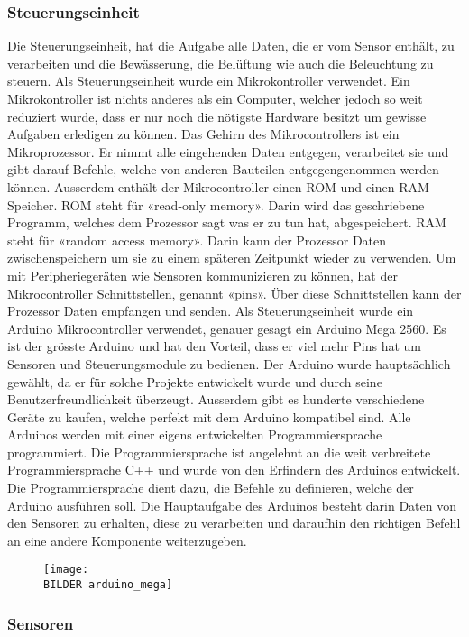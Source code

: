 \subsubsection{Steuerungseinheit}
Die Steuerungseinheit, hat die Aufgabe alle Daten, die er vom Sensor enthält, zu verarbeiten und die Bewässerung, die Belüftung wie auch die Beleuchtung zu steuern.
Als Steuerungseinheit wurde ein Mikrokontroller verwendet. Ein Mikrokontroller ist nichts anderes als ein Computer, welcher jedoch so weit reduziert wurde, dass er nur noch die nötigste Hardware besitzt um gewisse Aufgaben erledigen zu können. Das Gehirn des Mikrocontrollers ist ein Mikroprozessor. Er nimmt alle eingehenden Daten entgegen, verarbeitet sie und gibt darauf Befehle, welche von anderen Bauteilen entgegengenommen werden können. Ausserdem enthält der Mikrocontroller einen ROM und einen RAM Speicher. ROM steht für «read-only memory». Darin wird das geschriebene Programm, welches dem Prozessor sagt was er zu tun hat, abgespeichert. RAM steht für «random access memory». Darin kann der Prozessor Daten zwischenspeichern um sie zu einem späteren Zeitpunkt wieder zu verwenden. Um mit Peripheriegeräten wie Sensoren kommunizieren zu können, hat der Mikrocontroller Schnittstellen, genannt «pins». Über diese Schnittstellen kann der Prozessor Daten empfangen und senden.
Als Steuerungseinheit wurde ein Arduino Mikrocontroller verwendet, genauer gesagt ein Arduino Mega 2560. Es ist der grösste Arduino und hat den Vorteil, dass er viel mehr Pins hat um Sensoren und Steuerungsmodule zu bedienen. Der Arduino wurde hauptsächlich gewählt, da er für solche Projekte entwickelt wurde und durch seine Benutzerfreundlichkeit überzeugt. Ausserdem gibt es hunderte verschiedene Geräte zu kaufen, welche perfekt mit dem Arduino kompatibel sind.
Alle Arduinos werden mit einer eigens entwickelten Programmiersprache programmiert. Die Programmiersprache ist angelehnt an die weit verbreitete Programmiersprache C++ und wurde von den Erfindern des Arduinos entwickelt. Die Programmiersprache dient dazu, die Befehle zu definieren, welche der Arduino ausführen soll.
Die Hauptaufgabe des Arduinos besteht darin Daten von den Sensoren zu erhalten, diese zu verarbeiten und daraufhin den richtigen Befehl an eine andere Komponente weiterzugeben.

\begin{figure}[H]
  \centering
  \texttt{[image: \\BILDER arduino\_mega]}
\end{figure}

\subsubsection{Sensoren}
